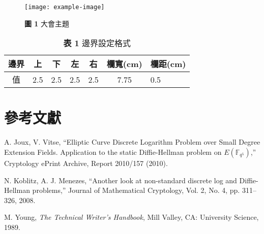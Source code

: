 \documentclass[10pt, a4paper]{article}
\begin{document}
\begin{CJK}{UTF8}{bsmi}
\begin{figure}[h]
  \centering
  \texttt{[image: example-image]}
  \caption{\textbf{圖 1} 大會主題}
\end{figure}

\begin{table}[h]
  \centering
  \caption{\textbf{表 1} 邊界設定格式}
  \begin{tabular}{|c|c|c|c|c|c|}
    \hline
    邊界 & 上 & 下 & 左 & 右 & 欄寬(cm) & 欄距(cm) \\
    \hline
    值 & 2.5 & 2.5 & 2.5 & 2.5 & 7.75 & 0.5 \\
    \hline
  \end{tabular}
\end{table}

\section{參考文獻}


\begin{thebibliography}{99}
A. Joux, V. Vitse, ``Elliptic Curve Discrete Logarithm Problem over Small Degree Extension Fields. Application to the static Diffie-Hellman problem on $E(\mathbb{F}_{q^5})$,'' Cryptology ePrint Archive, Report 2010/157 (2010).

N. Koblitz, A. J. Menezes, ``Another look at non-standard discrete log and Diffie-Hellman problems,'' Journal of Mathematical Cryptology, Vol. 2, No. 4, pp. 311--326, 2008.

M. Young, \textit{The Technical Writer’s Handbook}, Mill Valley, CA: University Science, 1989.
\end{thebibliography}

\end{CJK}
\end{document}
